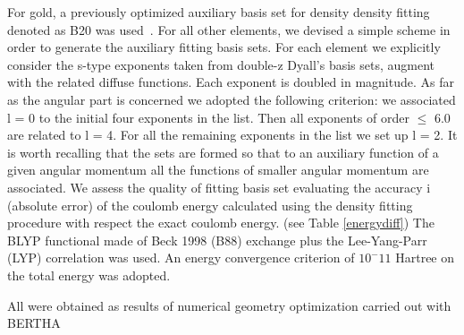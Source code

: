 \documentclass[journal=inoraj,manuscript=article]{achemso}
\begin{document}
 For gold, a previously optimized auxiliary basis set for density density fitting denoted as B20 was used~\cite{missedref}. For all other 
 elements, we devised a simple scheme in order to generate the auxiliary fitting basis sets. For each element we explicitly consider 
 the s-type exponents taken from double-z Dyall’s basis sets, augment with the related diffuse functions. Each exponent is doubled in magnitude. 
 As far as the angular part is concerned we adopted the following criterion: we associated l = 0 to the initial four exponents in the  list. Then all 
 exponents of order $\le$ 6.0 are related to l = 4. For all the remaining exponents in the list we set up l = 2.
 It is worth recalling that the sets are formed so that to an auxiliary function of a given angular momentum all the functions of smaller angular momentum 
 are associated. We
 assess the quality of fitting basis set evaluating the accuracy i
 (absolute error) of the coulomb energy calculated using the density fitting procedure 
 with respect the exact coulomb energy. (see Table \ref{energydiff})
The BLYP functional
made of Beck 1998 (B88) exchange \cite{missedref} plus the Lee-Yang-Parr (LYP) correlation \cite{missedref} was used. An energy convergence criterion of $10^-11$
Hartree 
on the total energy was adopted. 

All were obtained as results of numerical geometry optimization carried out with BERTHA
\end{document}
